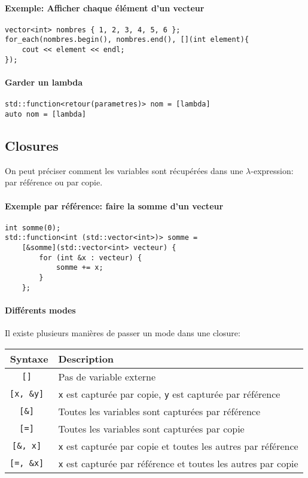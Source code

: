 \documentclass[10pt,a4paper,french]{article}
\begin{document}
\paragraph{Exemple: Afficher chaque élément d'un vecteur}
\begin{verbatim}
vector<int> nombres { 1, 2, 3, 4, 5, 6 };
for_each(nombres.begin(), nombres.end(), [](int element){
    cout << element << endl;
});
\end{verbatim}

\paragraph{Garder un lambda}
\begin{verbatim}
std::function<retour(parametres)> nom = [lambda]
auto nom = [lambda]
\end{verbatim}

\subsection{Closures}

On peut préciser comment les variables sont récupérées dans une $\lambda$-expression: par référence ou par copie.

\paragraph{Exemple par référence: faire la somme d'un vecteur}
\begin{verbatim}
int somme(0);
std::function<int (std::vector<int>)> somme =
    [&somme](std::vector<int> vecteur) {
        for (int &x : vecteur) {
            somme += x;
        }
    };
\end{verbatim}

\paragraph{Différents modes} Il existe plusieurs manières de passer un mode dans une closure:

\begin{tabular}{c|l}
Syntaxe & Description \\
\hline
\tt [] & Pas de variable externe \\
\tt [x, \&y] & {\tt x} est capturée par copie, {\tt y} est capturée par référence \\
\tt [\&] & Toutes les variables sont capturées par référence \\
\tt [=] & Toutes les variables sont capturées par copie \\
\tt [\&, x] & {\tt x} est capturée par copie et toutes les autres par référence \\
\tt [=, \&x] & {\tt x} est capturée par référence et toutes les autres par copie \\
\end{tabular}
\end{document}
